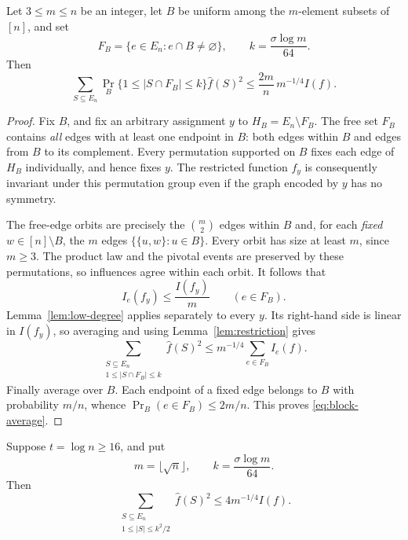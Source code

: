 \begin{proposition}
\label{prop:block}
Let $3\le m\le n$ be an integer, let $B$ be uniform among the
$m$-element subsets of $[n]$, and set
\[
 F_B=\{e\in E_n:e\cap B\ne\varnothing\},
 \qquad k=\frac{\sigma\log m}{64}.
\]
Then
\begin{equation}
 \sum_{S\subseteq E_n}
 \Pr_B\{1\le |S\cap F_B|\le k\}\widehat f(S)^2
 \le \frac{2m}{n}\,m^{-1/4}I(f).
 \label{eq:block-average}
\end{equation}
\end{proposition}

\begin{proof}
Fix $B$, and fix an arbitrary assignment $y$ to
$H_B=E_n\setminus F_B$.  The free set $F_B$ contains \emph{all} edges
with at least one endpoint in $B$: both edges within $B$ and edges
from $B$ to its complement.  Every permutation supported on $B$
fixes each edge of $H_B$ individually, and hence fixes $y$.
The restricted function $f_y$ is consequently invariant under this
permutation group even if the graph encoded by $y$ has no symmetry.

The free-edge orbits are precisely the $\binom m2$ edges within $B$
and, for each \emph{fixed} $w\in[n]\setminus B$, the $m$ edges
$\{\{u,w\}:u\in B\}$.  Every orbit has size at least $m$, since
$m\ge3$.  The product law and the pivotal events are preserved by
these permutations, so influences agree within each orbit.
It follows that
\[
 I_e(f_y)\le\frac{I(f_y)}m\qquad(e\in F_B).
\]
Lemma~\ref{lem:low-degree} applies separately to every $y$.  Its
right-hand side is linear in $I(f_y)$, so averaging and using
Lemma~\ref{lem:restriction} gives
\[
 \sum_{\substack{S\subseteq E_n\\1\le |S\cap F_B|\le k}}
       \widehat f(S)^2
 \le m^{-1/4}\sum_{e\in F_B}I_e(f).
\]
Finally average over $B$.  Each endpoint of a fixed edge belongs to
$B$ with probability $m/n$, whence
$\Pr_B(e\in F_B)\le2m/n$.  This proves
\eqref{eq:block-average}.
\end{proof}

\begin{lemma}
\label{lem:block-capture}
Suppose $t=\log n\ge16$, and put
\[
 m=\lfloor\sqrt n\rfloor,
 \qquad k=\frac{\sigma\log m}{64}.
\]
Then
\begin{equation}
 \sum_{\substack{S\subseteq E_n\\1\le |S|\le k^2/2}}
       \widehat f(S)^2
 \le 4m^{-1/4}I(f).
 \label{eq:captured-mass}
\end{equation}
\end{lemma}

